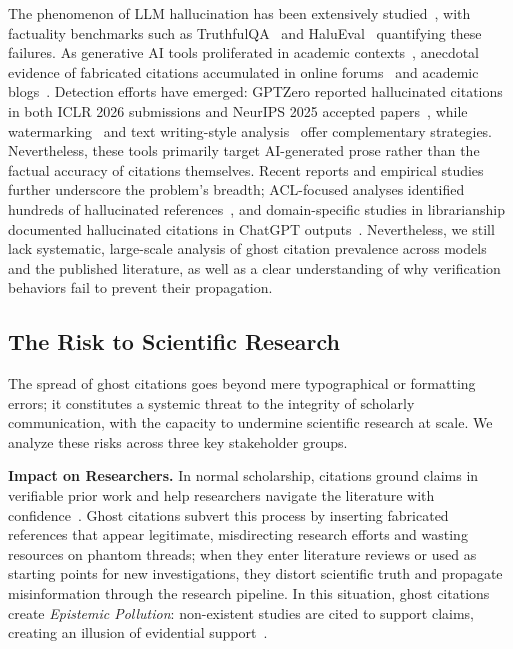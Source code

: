 The phenomenon of LLM hallucination has been extensively studied~\cite{ji2023survey,zhang2025siren,huang2023survey}, with factuality benchmarks such as TruthfulQA~\cite{lin2022truthfulqa} and HaluEval~\cite{li2023halueval} quantifying these failures.
As generative AI tools proliferated in academic contexts~\cite{lund2023chatgpt,cotton2024chatting,dwivedi2023so}, anecdotal evidence of fabricated citations accumulated in online forums~\cite{zoteroforum2018ghost} and academic blogs~\cite{consultmu2026ghost,tay2025why}.
Detection efforts have emerged: GPTZero reported hallucinated citations in both ICLR 2026 submissions and NeurIPS 2025 accepted papers~\cite{gptzero2026iclr,gptzero2025nips}, while watermarking~\cite{kirchenbauer2023watermark} and text writing-style analysis~\cite{mitchell2023detectgpt} offer complementary strategies.
Nevertheless, these tools primarily target AI-generated prose rather than the factual accuracy of citations themselves. Recent reports and empirical studies further underscore the problem's breadth; ACL-focused analyses identified hundreds of hallucinated references~\cite{sakai2026hallucitation}, and domain-specific studies in librarianship documented hallucinated citations in ChatGPT outputs~\cite{oladokun2025hallucitation}.
Nevertheless, we still lack systematic, large-scale analysis of ghost citation prevalence across models and the published literature, as well as a clear understanding of why verification
behaviors fail to prevent their propagation.

\subsection{The Risk to Scientific Research}
\label{sec:background:record}

The spread of ghost citations goes beyond mere typographical or formatting errors; it constitutes a systemic threat to the integrity of scholarly communication, with the capacity to undermine scientific research at scale. We analyze these risks across three key stakeholder groups.

\noindent
\textbf{Impact on Researchers.}
In normal scholarship, citations ground claims in verifiable prior work and help researchers navigate the literature with confidence~\cite{kaplan1965norms,merton1973sociology}.
Ghost citations subvert this process by inserting fabricated references that appear legitimate, misdirecting research efforts and wasting resources on phantom threads; when they enter literature reviews or used as starting points for new investigations, they distort scientific truth and propagate misinformation through the research pipeline.
In this situation, ghost citations create \textit{Epistemic Pollution}: non-existent studies are cited to support claims, creating an illusion of evidential support~\cite{greenberg2009how}.

